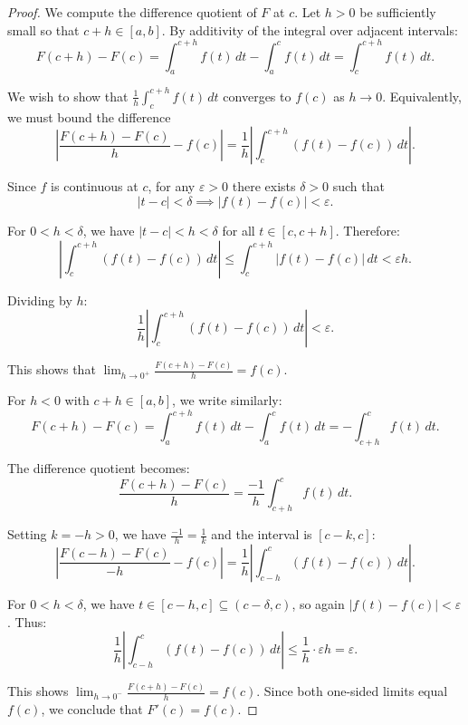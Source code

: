 \begin{proof}
    We compute the difference quotient of $F$ at $c$. Let $h > 0$ be sufficiently small so that $c+h \in [a, b]$. By additivity of the integral over adjacent intervals:
    $$F(c+h) - F(c) = \int_a^{c+h} f(t)\,dt - \int_a^c f(t)\,dt = \int_c^{c+h} f(t)\,dt.$$

    We wish to show that $\frac{1}{h}\int_c^{c+h} f(t)\,dt$ converges to $f(c)$ as $h \to 0$. Equivalently, we must bound the difference
    $$\left|\frac{F(c+h) - F(c)}{h} - f(c)\right| = \frac{1}{h}\left|\int_c^{c+h} (f(t) - f(c))\,dt\right|.$$

    Since $f$ is continuous at $c$, for any $\varepsilon > 0$ there exists $\delta > 0$ such that
    $$|t - c| < \delta \implies |f(t) - f(c)| < \varepsilon.$$

    For $0 < h < \delta$, we have $|t - c| < h < \delta$ for all $t \in [c, c+h]$. Therefore:
    $$\left|\int_c^{c+h} (f(t) - f(c))\,dt\right| \leq \int_c^{c+h} |f(t) - f(c)|\,dt < \varepsilon h.$$

    Dividing by $h$:
    $$\frac{1}{h}\left|\int_c^{c+h} (f(t) - f(c))\,dt\right| < \varepsilon.$$

    This shows that $\lim_{h \to 0^+} \frac{F(c+h) - F(c)}{h} = f(c)$.

    For $h < 0$ with $c+h \in [a, b]$, we write similarly:
    $$F(c+h) - F(c) = \int_a^{c+h} f(t)\,dt - \int_a^c f(t)\,dt = -\int_{c+h}^c f(t)\,dt.$$

    The difference quotient becomes:
    $$\frac{F(c+h) - F(c)}{h} = \frac{-1}{h}\int_{c+h}^c f(t)\,dt.$$

    Setting $k = -h > 0$, we have $\frac{-1}{h} = \frac{1}{k}$ and the interval is $[c-k, c]$:
    $$\left|\frac{F(c-h) - F(c)}{-h} - f(c)\right| = \frac{1}{h}\left|\int_{c-h}^c (f(t) - f(c))\,dt\right|.$$

    For $0 < h < \delta$, we have $t \in [c-h, c] \subseteq (c-\delta, c)$, so again $|f(t) - f(c)| < \varepsilon$. Thus:
    $$\frac{1}{h}\left|\int_{c-h}^c (f(t) - f(c))\,dt\right| \leq \frac{1}{h} \cdot \varepsilon h = \varepsilon.$$

    This shows $\lim_{h \to 0^-} \frac{F(c+h) - F(c)}{h} = f(c)$. Since both one-sided limits equal $f(c)$, we conclude that $F'(c) = f(c)$.
\end{proof}
